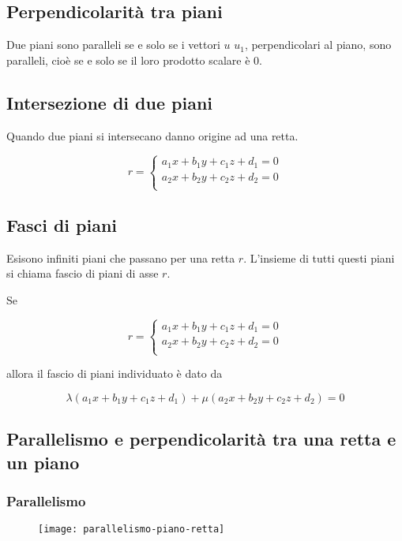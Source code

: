 \subsection{Perpendicolarità tra piani}

Due piani sono paralleli se e solo se i vettori $u$ $u_1$, perpendicolari al piano, sono paralleli, cioè se e solo se il loro prodotto scalare è 0.

\subsection{Intersezione di due piani}

Quando due piani si intersecano danno origine ad una retta.

$$
r =
\begin{cases}
a_1x+b_1y+c_1z+d_1 = 0 \\
a_2x+b_2y+c_2z+d_2 = 0 \\
\end{cases}
$$

\subsection{Fasci di piani}

Esisono infiniti piani che passano per una retta $r$. L'insieme di tutti questi piani si chiama fascio di piani di asse $r$.

Se

$$
r =
\begin{cases}
a_1x+b_1y+c_1z+d_1 = 0 \\
a_2x+b_2y+c_2z+d_2 = 0 \\
\end{cases}
$$

allora il fascio di piani individuato è dato da

$$
\lambda(a_1x+b_1y+c_1z+d_1) + \mu (a_2x+b_2y+c_2z+d_2) = 0
$$


\subsection{Parallelismo e perpendicolarità tra una retta e un piano}

\subsubsection{Parallelismo}

\begin{figure}[H]
\texttt{[image: parallelismo-piano-retta]}
\centering
\end{figure}

